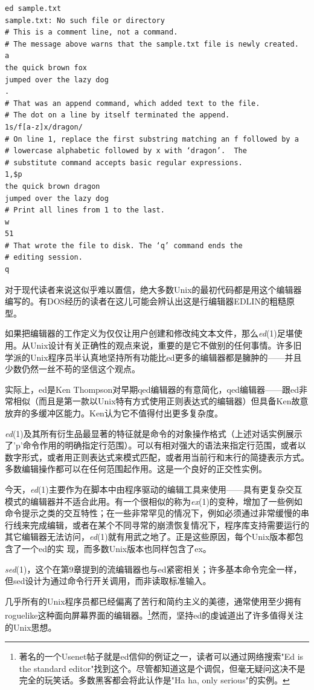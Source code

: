 \documentclass[12pt,oneside]{book}
\begin{document}
\begin{Verbatim}
ed sample.txt
sample.txt: No such file or directory
# This is a comment line, not a command.
# The message above warns that the sample.txt file is newly created.
a
the quick brown fox
jumped over the lazy dog
.
# That was an append command, which added text to the file.  
# The dot on a line by itself terminated the append.
1s/f[a-z]x/dragon/
# On line 1, replace the first substring matching an f followed by a
# lowercase alphabetic followed by x with ‘dragon’.  The
# substitute command accepts basic regular expressions.
1,$p
the quick brown dragon
jumped over the lazy dog
# Print all lines from 1 to the last.
w
51
# That wrote the file to disk. The ‘q’ command ends the
# editing session.
q
\end{Verbatim}

对于现代读者来说这似乎难以置信，绝大多数Unix的最初代码都是用这个编辑器编写的。有DOS经历的读者在这儿可能会辨认出这是行编辑器EDLIN的粗糙原型。

如果把编辑器的工作定义为仅仅让用户创建和修改纯文本文件，那么\textit{ed}(1)足堪使用。从Unix设计有关正确性的观点来说，重要的是它不做别的任何事情。许多旧学派的Unix程序员半认真地坚持所有功能比ed更多的编辑器都是臃肿的——并且少数仍然一丝不苟的坚信这个观点。

实际上，ed是Ken Thompson对早期qed\cite{RitchieQED}编辑器的有意简化，qed编辑器——跟ed非常相似（而且是第一款以Unix特有方式使用正则表达式的编辑器）但具备Ken故意放弃的多缓冲区能力。Ken认为它不值得付出更多复杂度。

\textit{ed}(1)及其所有衍生品最显著的特征就是命令的对象操作格式（上述对话实例展示了'p'命令作用的明确指定行范围）。可以有相对强大的语法来指定行范围，或者以数字形式，或者用正则表达式来模式匹配，或者用当前行和末行的简捷表示方式。多数编辑操作都可以在任何范围起作用。这是一个良好的正交性实例。

今天，\textit{ed}(1)主要作为在脚本中由程序驱动的编辑工具来使用——具有更复杂交互模式的编辑器并不适合此用。有一个很相似的称为\textit{ex}(1)的变种，增加了一些例如命令提示之类的交互特性；在一些非常罕见的情况下，例如必须通过非常缓慢的串行线来完成编辑，或者在某个不同寻常的崩溃恢复情况下，程序库支持需要运行的其它编辑器无法访问，\textit{ed}(1)就有用武之地了。正是这些原因，每个Unix版本都包含了一个ed的实
现，而多数Unix版本也同样包含了ex。

\textit{sed}(1)，这个在第9章提到的流编辑器也与ed紧密相关；许多基本命令完全一样，但sed设计为通过命令行开关调用，而非读取标准输入。

几乎所有的Unix程序员都已经偏离了苦行和简约主义的美德，通常使用至少拥有roguelike这种面向屏幕界面的编辑器。\footnote{著名的一个Usenet帖子就是ed信仰的例证之一，读者可以通过网络搜索"Ed is the standard editor"找到这个。尽管都知道这是个调侃，但毫无疑问这决不是完全的玩笑话。多数黑客都会将此认作是"Ha ha, only serious"的实例。}然而，坚持ed的虔诚道出了许多值得关注的Unix思想。
\end{document}
